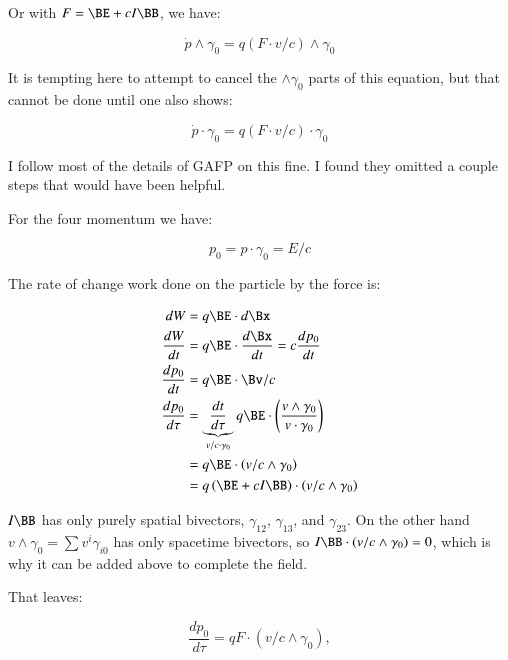 \documentclass{article}
\begin{document}
Or with $F = \BE + c I \BB$, we have:

\begin{equation}\label{eqn:pvec}
\dot{p} \wedge \gamma_0 = q ( F \cdot v/c ) \wedge \gamma_0
\end{equation}

It is tempting here to attempt to cancel the $\wedge \gamma_0$ parts of this equation, but that cannot be done
until one also shows:

\begin{equation*}
\dot{p} \cdot \gamma_0 = q ( F \cdot v/c ) \cdot \gamma_0
\end{equation*}

I follow most of the details of GAFP on this fine.  I found they omitted a couple steps that would have been helpful.

For the four momentum we have:

\begin{equation*}
p_0 = p \cdot \gamma_0 = E/c
\end{equation*}

The rate of change work done on the particle by the force is:

\begin{align*}
dW &= q\BE \cdot d\Bx \\
\frac{dW}{dt} &= q\BE \cdot \frac{d\Bx}{dt} = c \frac{dp_0}{dt} \\
\frac{dp_0}{dt} &= q\BE \cdot \Bv/c \\
\frac{dp_0}{d\tau} &= \underbrace{\frac{dt}{d\tau}}_{v/c \cdot \gamma_0} q\BE \cdot \left( \frac{v \wedge \gamma_0}{v \cdot \gamma_0} \right) \\
                   &= q\BE \cdot \left(v/c \wedge \gamma_0\right) \\
                   &= q \left(\BE + c I \BB\right) \cdot \left(v/c \wedge \gamma_0\right) \\
\end{align*}

$I\BB$ has only purely spatial bivectors, $\gamma_{12}$, $\gamma_{13}$, and $\gamma_{23}$.  On the other hand $v \wedge \gamma_0 = \sum v^i \gamma_{i0}$ has only spacetime bivectors, so $I\BB \cdot (v/c \wedge \gamma_0) = 0$, which is why it can be added above to complete the field.

That leaves:

\begin{equation}\label{eqn:p0wedgedotwedge}
\frac{dp_0}{d\tau} = q F \cdot \left(v/c \wedge \gamma_0\right),
\end{equation}
\end{document}

